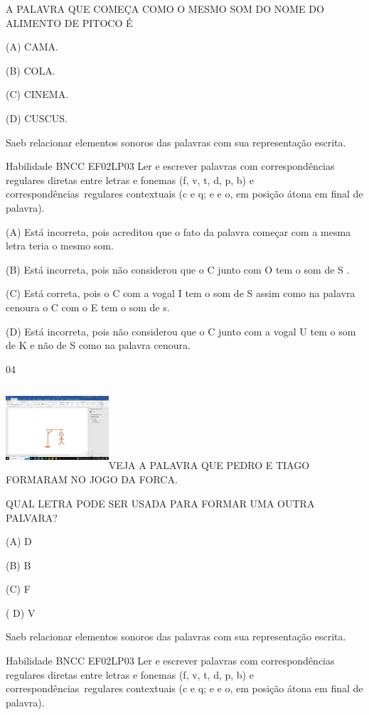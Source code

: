 {{{{{{\protect\hypertarget{_Hlk129504325}{}{}A PALAVRA QUE COMEÇA COMO O MESMO
SOM DO NOME DO ALIMENTO DE PITOCO É

(A) CAMA.

(B) COLA.

(C) CINEMA.

(D) CUSCUS.

Saeb relacionar elementos sonoros das palavras com sua representação
escrita.

Habilidade BNCC EF02LP03 Ler e escrever palavras com correspondências
regulares diretas entre letras e fonemas (f, v, t, d, p, b) e
correspondências~regulares contextuais (c e q; e e o, em posição átona
em final de palavra).

\protect\hypertarget{_Hlk129366993}{}{}(A) Está incorreta, pois
acreditou que o fato da palavra começar com a mesma letra teria o mesmo
som.

(B) Está incorreta, pois não considerou que o C junto com O tem o som de
S .

(C) Está correta, pois o C com a vogal I tem o som de S assim como na
palavra cenoura o C com o E tem o som de s.

(D) Está incorreta, pois não considerou que o C junto com a vogal U tem
o som de K e não de S como na palavra cenoura.

\num{04}

\includegraphics[width=1.50909in,height=1.22355in]{media/image150.png}VEJA
A PALAVRA QUE PEDRO E TIAGO FORMARAM NO JOGO DA FORCA.

\protect\hypertarget{_Hlk129505254}{}{}QUAL LETRA PODE SER USADA PARA
FORMAR UMA OUTRA PALVARA?

(A) D

(B) B

(C) F

( D) V

Saeb relacionar elementos sonoros das palavras com sua representação
escrita.

Habilidade BNCC EF02LP03 Ler e escrever palavras com correspondências
regulares diretas entre letras e fonemas (f, v, t, d, p, b) e
correspondências~regulares contextuais (c e q; e e o, em posição átona
em final de palavra).

}}}}}}
